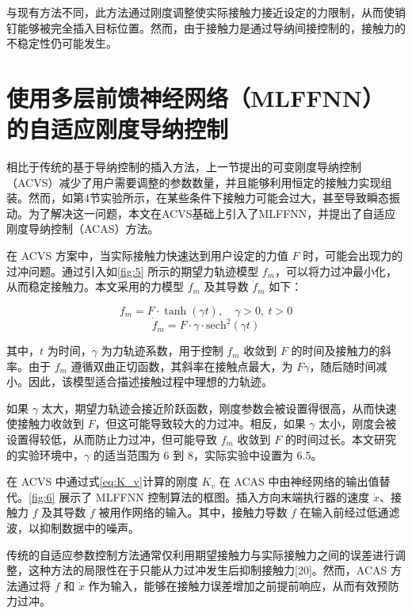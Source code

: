 \documentclass{Diploma}
\begin{document}
与现有方法不同，此方法通过刚度调整使实际接触力接近设定的力限制，从而使销钉能够被完全插入目标位置。然而，由于接触力是通过导纳间接控制的，接触力的不稳定性仍可能发生。

\section{使用多层前馈神经网络（MLFFNN）的自适应刚度导纳控制}
相比于传统的基于导纳控制的插入方法，上一节提出的可变刚度导纳控制（ACVS）减少了用户需要调整的参数数量，并且能够利用恒定的接触力实现组装。然而，如第4节实验所示，在某些条件下接触力可能会过大，甚至导致瞬态振动。为了解决这一问题，本文在ACVS基础上引入了MLFFNN，并提出了自适应刚度导纳控制（ACAS）方法。

在 ACVS 方案中，当实际接触力快速达到用户设定的力值 $F$ 时，可能会出现力的过冲问题。通过引入如\ref{fig:5} 所示的期望力轨迹模型 $f_m$，可以将力过冲最小化，从而稳定接触力。本文采用的力模型 $f_m$ 及其导数 $\dot{f}_m$ 如下：

%

\begin{equation} \label{eq:f_m}
f_m = F \cdot \tanh(\gamma t), \quad \gamma > 0, \ t > 0
\end{equation}
\begin{equation} \label{eq:dot_f_m}
\dot{f}_m = F \cdot \gamma \cdot \mathrm{sech}^2(\gamma t)
\end{equation}

其中，$t$ 为时间，$\gamma$ 为力轨迹系数，用于控制 $f_m$ 收敛到 $F$ 的时间及接触力的斜率。由于 $f_m$ 遵循双曲正切函数，其斜率在接触点最大，为 $F \gamma$，随后随时间减小。因此，该模型适合描述接触过程中理想的力轨迹。

如果 $\gamma$ 太大，期望力轨迹会接近阶跃函数，刚度参数会被设置得很高，从而快速使接触力收敛到 $F$，但这可能导致较大的力过冲。相反，如果 $\gamma$ 太小，刚度会被设置得较低，从而防止力过冲，但可能导致 $f_m$ 收敛到 $F$ 的时间过长。本文研究的实验环境中，$\gamma$ 的适当范围为 6 到 8，实际实验中设置为 6.5。

在 ACVS 中通过式\eqref{eq:K_v}计算的刚度 $K_v$ 在 ACAS 中由神经网络的输出值替代。\ref{fig:6} 展示了 MLFFNN 控制算法的框图。插入方向末端执行器的速度 $\dot{x}$、接触力 $f$ 及其导数 $\dot{f}$ 被用作网络的输入。其中，接触力导数 $\dot{f}$ 在输入前经过低通滤波，以抑制数据中的噪声。

%
传统的自适应参数控制方法通常仅利用期望接触力与实际接触力之间的误差进行调整，这种方法的局限性在于只能从力过冲发生后抑制接触力[20]。然而，ACAS 方法通过将 $\dot{f}$ 和 $\dot{x}$ 作为输入，能够在接触力误差增加之前提前响应，从而有效预防力过冲。
\end{document}
